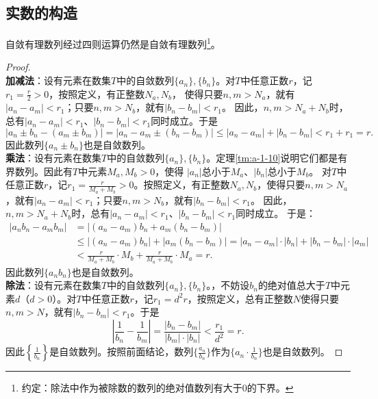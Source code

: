 \documentclass[12pt,UTF8,fontset=none]{ctexbook}
\begin{document}
\begin{appendix}
\section{实数的构造}

\begin{tm}\label{tm:a-1-3}
    自敛有理数列经过四则运算仍然是自敛有理数列\footnote{约定：除法中作为被除数的数列的绝对值数列有大于$0$的下界。}。
\end{tm}
\begin{proof}
    \mbox{} \\
    \textbf{加减法}：设有元素在数集$T$中的自敛数列$\{a_n\}, \{b_n\}$。对$T$中任意正数$r$，记$r_1=\frac{r}{2}>0$，按照定义，有正整数$N_a, N_b$，
    使得只要$n,m>N_a$，就有$|a_n - a_m| < r_1$；只要$n,m>N_b$，就有$|b_n - b_m| < r_1$。
    因此，$n,m>N_a+N_b$时，总有$|a_n - a_m| < r_1$、$|b_n - b_m| < r_1$同时成立。于是
    $$ |a_n \pm b_n - (a_m \pm b_m)| = |a_n - a_m \pm (b_n - b_m)| \leqslant |a_n - a_m| + |b_n - b_m| < r_1 + r_1 = r. $$
    因此数列$\{a_n \pm b_n\}$也是自敛数列。\\
    \textbf{乘法}：设有元素在数集$T$中的自敛数列$\{a_n\}, \{b_n\}$。定理\ref{tm:a-1-10}说明它们都是有界数列。因此有$T$中元素$M_a, M_b>0$，使得
    $|a_n|$总小于$M_a$、$|b_n|$总小于$M_b$。
    对$T$中任意正数$r$，记$r_1 = \frac{r}{M_a + M_b}>0$。按照定义，有正整数$N_a, N_b$，使得只要$n,m>N_a$，就有$|a_n - a_m| < r_1$；只要$n,m>N_b$，就有$|b_n - b_m| < r_1$。
    因此，$n,m>N_a+N_b$时，总有$|a_n - a_m| < r_1$、$|b_n - b_m| < r_1$同时成立。
    于是：
    \begin{align*}
        |a_nb_n - a_mb_m| &= |(a_n - a_m)b_n + a_m(b_n - b_m)|  \\
        &\leqslant |(a_n - a_m)b_n| + |a_m(b_n - b_m)| = |a_n - a_m|\cdot |b_n| + |b_n - b_m|\cdot|a_m|  \\
        &< \frac{r}{M_a + M_b} \cdot M_b + \frac{r}{M_a + M_b} \cdot M_a = r. 
    \end{align*}
    因此数列$\{a_n b_n\}$也是自敛数列。\\
    \textbf{除法}：设有元素在数集$T$中的自敛数列$\{a_n\}, \{b_n\}$。，不妨设$b_n$的绝对值总大于$T$中元素$d$（$d > 0$）。对$T$中任意正数$r$，记$r_1 = d^2r$，按照定义，总有正整数$N$使得只要$n,m>N$，就有$|b_n - b_m| < r_1$。于是
    $$ \left| \frac{1}{b_n} - \frac{1}{b_m}\right| = \frac{|b_n - b_m|}{|b_m|\cdot |b_n|} < \frac{r_1}{d^2} = r. $$
    因此$\left\{\frac{1}{b_n}\right\}$是自敛数列。按照前面结论，数列$\{\frac{a_n}{b_n}\}$作为$\{a_n \cdot \frac{1}{b_n}\}$也是自敛数列。
\end{proof}


\end{appendix}
\end{document}
